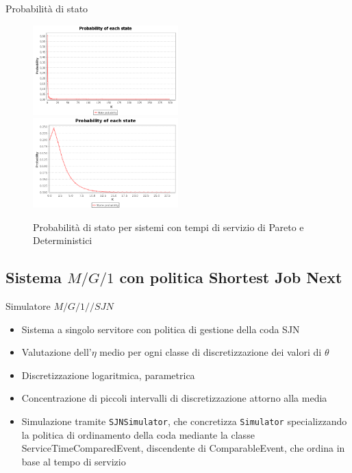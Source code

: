 \documentclass[slidestop,compress,mathserif]{beamer}
\begin{document}
\begin{frame}{Probabilit\`a di stato}
\begin{figure}[!h]{
	\begin{center}
	   \includegraphics[width=0.5\textwidth]{figures/statepareto.png}
	   \includegraphics[width=0.5\textwidth]{figures/mg1k.png}
	\end{center}}
	\caption{Probabilit\`a di stato per sistemi con tempi di servizio di Pareto e Deterministici}
	\label{fig:random}
\end{figure}
\end{frame}

\subsection{Sistema $M/G/1$ con politica Shortest Job Next}
\begin{frame}{Simulatore  $M/G/1//SJN$}
\vfill
\begin{itemize}
	\item Sistema a singolo servitore con politica di gestione della coda SJN
	\item Valutazione dell'$\eta$ medio per ogni classe di discretizzazione dei valori di $\theta$
	\item Discretizzazione logaritmica, parametrica
	\item Concentrazione di piccoli intervalli di discretizzazione attorno alla media
	\item Simulazione tramite {\tt SJNSimulator}, che concretizza {\tt Simulator} specializzando la politica di ordinamento della coda mediante la classe ServiceTimeComparedEvent, discendente di ComparableEvent, che ordina in base al tempo di servizio
\end{itemize}
\vfill
\end{frame}
\end{document}
